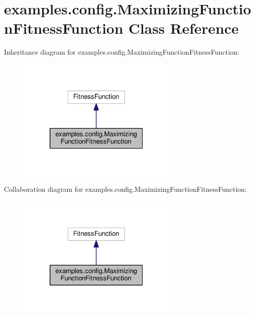 \hypertarget{classexamples_1_1config_1_1_maximizing_function_fitness_function}{\section{examples.\-config.\-Maximizing\-Function\-Fitness\-Function Class Reference}
\label{classexamples_1_1config_1_1_maximizing_function_fitness_function}
}


Inheritance diagram for examples.\-config.\-Maximizing\-Function\-Fitness\-Function\-:
\nopagebreak
\begin{figure}[H]
\begin{center}
\leavevmode
\includegraphics[width=220pt]{classexamples_1_1config_1_1_maximizing_function_fitness_function__inherit__graph}
\end{center}
\end{figure}


Collaboration diagram for examples.\-config.\-Maximizing\-Function\-Fitness\-Function\-:
\nopagebreak
\begin{figure}[H]
\begin{center}
\leavevmode
\includegraphics[width=220pt]{classexamples_1_1config_1_1_maximizing_function_fitness_function__coll__graph}
\end{center}
\end{figure}
